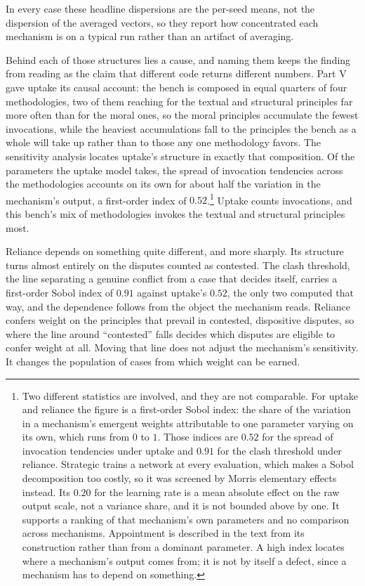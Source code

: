 In every case these headline dispersions are the per-seed means, not the
dispersion of the averaged vectors, so they report how concentrated each
mechanism is on a typical run rather than an artifact of averaging.

Behind each of those structures lies a cause, and naming them keeps the
finding from reading as the claim that different code returns different
numbers.
Part V gave uptake its causal account: the bench is composed in equal
quarters of four methodologies, two of them reaching for the textual and
structural principles far more often than for the moral ones, so the moral
principles accumulate the fewest invocations, while the heaviest accumulations
fall to the principles the bench as a whole will take up rather than to those
any one methodology favors. The sensitivity analysis locates uptake's structure in exactly that
composition. Of the parameters the uptake model takes, the spread of
invocation tendencies across the methodologies accounts on its own for
about half the variation in the mechanism's output, a first-order
index of $0.52$.\footnote{Two different statistics are involved, and they are not
comparable. For uptake and reliance the figure is a first-order Sobol
index: the share of the variation in a mechanism's emergent weights
attributable to one parameter varying on its own, which runs from $0$ to
$1$. Those indices are $0.52$ for the spread of invocation tendencies under
uptake and $0.91$ for the clash threshold under reliance. Strategic trains
a network at every evaluation, which makes a Sobol decomposition too
costly, so it was screened by Morris elementary effects instead. Its $0.20$
for the learning rate is a mean absolute effect on the raw output scale,
not a variance share, and it is not bounded above by one. It supports a
ranking of that mechanism's own parameters and no comparison across
mechanisms. Appointment is described in the text from its construction
rather than from a dominant parameter. A high index locates where a
mechanism's output comes from; it is not by itself a defect, since a
mechanism has to depend on something.} Uptake counts invocations, and
this bench's mix of methodologies invokes the textual and structural
principles most.

Reliance depends on something quite different, and more sharply. Its
structure turns almost entirely on the disputes counted as contested. The
clash threshold, the line separating a genuine
conflict from a case that decides itself, carries a first-order Sobol index of $0.91$ against uptake's $0.52$, the only
two computed that way, and the dependence follows
from the object the mechanism reads. Reliance confers weight
on the principles that prevail in contested, dispositive disputes, so
where the line around ``contested'' falls decides which disputes are eligible
to confer weight at all. Moving that line does not adjust the mechanism's sensitivity. It changes
the population of cases from which weight can be earned.

